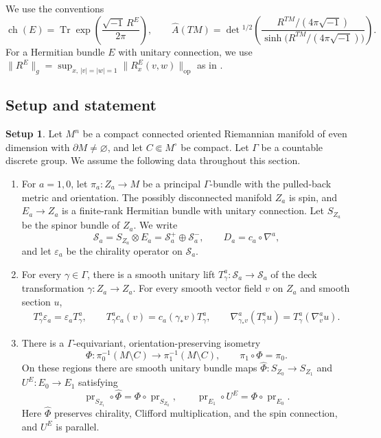 \documentclass[12pt,reqno]{amsart}
\numberwithin{equation}{section}
\theoremstyle{definition}
\newtheorem{setup}[theorem]{Setup}
\newcommand{\Ahat}{\widehat A}
\newcommand{\ch}{\operatorname{ch}}
\newcommand{\Tr}{\operatorname{Tr}}
\newcommand{\cS}{\mathcal S}
\begin{document}
We use the conventions
\[
 \ch(E)=\Tr\exp\!\left(\frac{\sqrt{-1}\,R^E}{2\pi}\right),\qquad
 \Ahat(TM)=\det{}^{1/2}\!\left(
 \frac{R^{TM}/(4\pi\sqrt{-1})}
 {\sinh\bigl(R^{TM}/(4\pi\sqrt{-1})\bigr)}
 \right).
\]
For a Hermitian bundle $E$ with unitary connection, we use $\|R^E\|_g =\sup_{x,\,|v|=|w|=1} \|R_x^E(v,w)\|_{\mathrm{op}}$ as in \cite[Lemma~5]{BaerHankeKCowaist}.


\subsection{Setup and statement}

\begin{setup}\label{setup:data}
Let $M^n$ be a compact connected oriented Riemannian manifold of even
dimension with $\partial M\ne\varnothing$, and let
$C\Subset M^\circ$ be compact.  Let $\Gamma$ be a countable discrete
group.  We assume the following data throughout this section.
\begin{enumerate}[label=\textup{(S\arabic*)},ref=\textup{(S\arabic*)},
                  leftmargin=3.4em]
\item\label{setup:covering}
For $a=1,0$, let $\pi_a:Z_a\to M$ be a principal
$\Gamma$-bundle with the pulled-back metric and orientation.  The
possibly disconnected manifold $Z_a$ is spin, and $E_a\to Z_a$ is a
finite-rank Hermitian bundle with unitary connection.  Let $S_{Z_a}$
be the spinor bundle of $Z_a$.  We write
\[
 \cS_a=S_{Z_a}\otimes E_a=\cS_a^+\oplus\cS_a^- ,
 \qquad D_a=c_a\circ\nabla^a,
\]
and let $\varepsilon_a$ be the chirality operator on $\cS_a$.

\item\label{setup:lifts}
For every $\gamma\in\Gamma$, there is a smooth unitary lift
$T^a_\gamma:\cS_a\to\cS_a$ of the deck transformation $\gamma:Z_a\to Z_a$.
For every smooth vector field $v$ on $Z_a$ and smooth section $u$,
\begin{equation}\label{eq:T-properties}
 \begin{gathered}
 T^a_\gamma\varepsilon_a=\varepsilon_aT^a_\gamma,\qquad
 T^a_\gamma c_a(v)=c_a(\gamma_*v)T^a_\gamma,\qquad
 \nabla^a_{\gamma_*v}(T^a_\gamma u)
 =T^a_\gamma(\nabla^a_vu).
 \end{gathered}
\end{equation}


\item\label{setup:exterior}
There is a $\Gamma$-equivariant, orientation-preserving isometry
\[
 \Phi:\pi_0^{-1}(M\setminus C)\longrightarrow
 \pi_1^{-1}(M\setminus C),\qquad \pi_1\circ\Phi=\pi_0.
\]
On these regions there are smooth unitary bundle maps
$\widehat\Phi:S_{Z_0}\to S_{Z_1}$ and $U^E:E_0\to E_1$ satisfying
\[
 \operatorname{pr}_{S_{Z_1}}\circ\widehat\Phi
 =\Phi\circ\operatorname{pr}_{S_{Z_0}},\qquad
 \operatorname{pr}_{E_1}\circ U^E
 =\Phi\circ\operatorname{pr}_{E_0}.
\]
Here $\widehat\Phi$ preserves chirality, Clifford multiplication,
and the spin connection, and $U^E$ is parallel.


\end{enumerate}
\end{setup}
\end{document}

